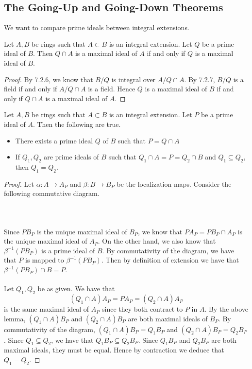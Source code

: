 \documentclass[a4paper]{article}
\begin{document}
\subsection{The Going-Up and Going-Down Theorems}
We want to compare prime ideals between integral extensions. 

\begin{lmm}{}{} Let $A,B$ be rings such that $A\subset B$ is an integral extension. Let $Q$ be a prime ideal of $B$. Then $Q\cap A$ is a maximal ideal of $A$ if and only if $Q$ is a maximal ideal of $B$. 
\begin{proof}
By 7.2.6, we know that $B/Q$ is integral over $A/Q\cap A$. By 7.2.7, $B/Q$ is a field if and only if $A/Q\cap A$ is a field. Hence $Q$ is a maximal ideal of $B$ if and only if $Q\cap A$ is a maximal ideal of $A$. 
\end{proof}
\end{lmm}

\begin{prp}{}{} Let $A,B$ be rings such that $A\subset B$ is an integral extension. Let $P$ be a prime ideal of $A$. Then the following are true. 
\begin{itemize}
\item There exists a prime ideal $Q$ of $B$ such that $P=Q\cap A$
\item If $Q_1,Q_2$ are prime ideals of $B$ such that $Q_1\cap A=P=Q_2\cap B$ and $Q_1\subseteq Q_2$, then $Q_1=Q_2$. 
\end{itemize} 
\begin{proof}
Let $\alpha:A\to A_P$ and $\beta:B\to B_P$ be the localization maps. Consider the following commutative diagram. \\~\\
\\~\\
Since $PB_P$ is the unique maximal ideal of $B_P$, we know that $PA_P=PB_P\cap A_P$ is the unique maximal ideal of $A_P$. On the other hand, we also know that $\beta^{-1}(PB_P)$ is a prime ideal of $B$. By commutativity of the diagram, we have that $P$ is mapped to $\beta^{-1}(PB_P)$. Then by definition of extension we have that $\beta^{-1}(PB_P)\cap B=P$. \\~\\

Let $Q_1,Q_2$ be as given. We have that $$(Q_1\cap A)A_P=PA_P=(Q_2\cap A)A_P$$ is the same maximal ideal of $A_P$ since they both contract to $P$ in $A$. By the above lemma, $(Q_1\cap A)B_P$ and $(Q_2\cap A)B_P$ are both maximal ideals of $B_P$. By commutativity of the diagram, $(Q_1\cap A)B_P=Q_1B_P$ and $(Q_2\cap A)B_P=Q_2B_P$. Since $Q_1\subseteq Q_2$, we have that $Q_1B_P\subseteq Q_2B_P$. Since $Q_1B_P$ and $Q_2B_P$ are both maximal ideals, they must be equal. Hence by contraction we deduce that $Q_1=Q_2$. 
\end{proof}
\end{prp}
\end{document}

